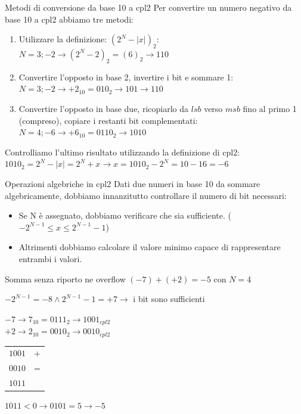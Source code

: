 \documentclass[]{beamer}
\begin{document}
\begin{frame}{Metodi di conversione da base 10 a cpl2}
Per convertire un numero negativo da base 10 a cpl2 abbiamo tre metodi:
\begin{enumerate}[<+->]
	\item Utilizzare la definizione: $(2^N-|x|)_2$:\\
	$N=3; -2 \rightarrow (2^N-2)_2 = (6)_2 \rightarrow 110$
	\item Convertire l'opposto in base 2, invertire i bit e sommare 1:\\
	$N=3; -2 \rightarrow +2_{10} = 010_2 \rightarrow 101 \rightarrow 110$
	\item Convertire l'opposto in base due, ricopiarlo da $lsb$ verso $msb$ fino al primo 1 (compreso), copiare i restanti bit complementati:\\
	$N=4; -6 \rightarrow +6_{10} = 0110_2 \rightarrow 1010$
\end{enumerate}

\pause
Controlliamo l'ultimo risultato utilizzando la definizione di cpl2: $1010_2 = 2^N - |x| = 2^N+x \rightarrow x=1010_2-2^N = 10-16 = -6$
\end{frame}

\begin{frame}{Operazioni algebriche in cpl2}
Dati due numeri in base 10 da sommare algebricamente, dobbiamo innanzitutto controllare il numero di bit necessari:
\begin{itemize}
	\item Se N è assegnato, dobbiamo verificare che sia sufficiente. ($-2^{N-1} \leq x \leq 2^{N-1}-1$)
	\item Altrimenti dobbiamo calcolare il valore minimo capace di rappresentare \alert{entrambi} i valori.
\end{itemize}
\end{frame}

\begin{frame}{Somma senza riporto ne overflow}
$(-7) + (+2) = -5$ con $N=4$

\pause
$-2^{N-1} = -8 \wedge 2^{N-1}-1 = +7 \rightarrow$ i bit sono sufficienti

\pause
$-7 \rightarrow 7_{10} = 0111_2 \rightarrow 1001_{cpl2}$\\
$+2 \rightarrow 2_{10} = 0010_2 \rightarrow 0010_{cpl2}$

\pause
\begin{tabular}{c|c}
	$1001$ & + \\
	$0010$ & = \\
	\hline
	$1011$& \\
\end{tabular}

\pause
$1011 < 0 \rightarrow 0101 = 5 \rightarrow -5$
\end{frame}
\end{document}
